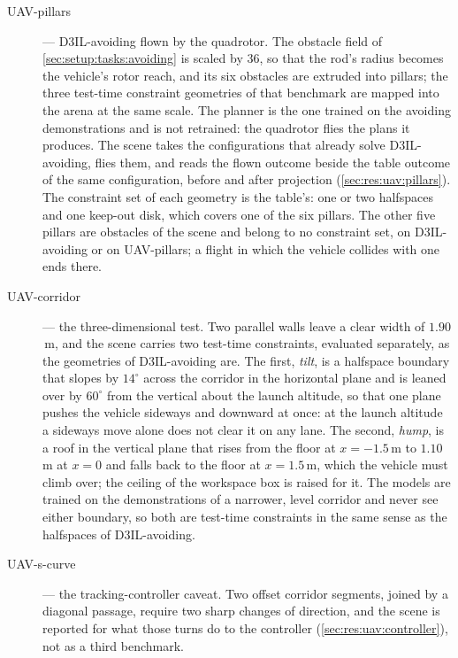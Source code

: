 \begin{description}
  \item[UAV-pillars] --- D3IL-avoiding flown by the quadrotor. The obstacle field of
    \autoref{sec:setup:tasks:avoiding} is scaled by $36$, so that the rod's radius becomes the vehicle's
    rotor reach, and its six obstacles are extruded into pillars; the three test-time constraint
    geometries of that benchmark are mapped into the arena at the same scale. The planner is the one
    trained on the avoiding demonstrations and is not retrained: the quadrotor flies the plans it
    produces. The scene takes the configurations that already solve D3IL-avoiding, flies them,
    and reads the flown outcome beside the table outcome of the same configuration, before and after
    projection (\autoref{sec:res:uav:pillars}). The constraint set of each geometry is the table's: one or
    two halfspaces and one keep-out disk, which covers one of the six pillars. The other five pillars are
    obstacles of the scene and belong to no constraint set, on D3IL-avoiding or on UAV-pillars; a flight in
    which the vehicle collides with one ends there.
  \item[UAV-corridor] --- the three-dimensional test. Two parallel walls leave a clear width of
    $1.90$\,m, and the scene carries two test-time constraints, evaluated separately, as the geometries
    of D3IL-avoiding are. The first, \emph{tilt}, is a halfspace boundary that slopes by $14^\circ$
    across the corridor in the horizontal plane and is leaned over by $60^\circ$ from the vertical about
    the launch altitude, so that one plane pushes the vehicle sideways and downward at once: at the
    launch altitude a sideways move alone does not clear it on any lane. The second, \emph{hump}, is a
    roof in the vertical plane that rises from the floor at $x=-1.5$\,m to $1.10$\,m at $x=0$ and falls
    back to the floor at $x=1.5$\,m, which the vehicle must climb over; the ceiling of the workspace box
    is raised for it. The models are trained on the demonstrations of a narrower, level corridor and
    never see either boundary, so both are test-time constraints in the same sense as the halfspaces of
    D3IL-avoiding.
  \item[UAV-s-curve] --- the tracking-controller caveat. Two offset corridor segments, joined by a
    diagonal passage, require two sharp changes of direction, and the scene is reported for what those
    turns do to the controller (\autoref{sec:res:uav:controller}), not as a third benchmark.
\end{description}

